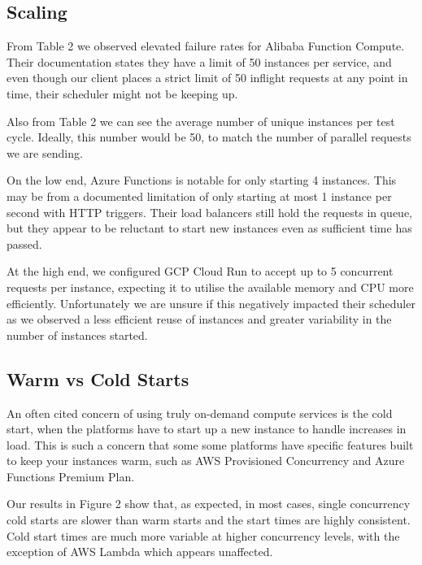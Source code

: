 \documentclass[11pt]{article}
\begin{document}
\subsection{Scaling}
From Table 2 %
we observed elevated failure rates for Alibaba Function Compute.
Their documentation %
states they have a limit of 50 instances per service,
and even though our client places a strict limit of 50 inflight requests at any point in time,
their scheduler might not be keeping up.

Also from Table 2 %
we can see the average number of unique instances per test cycle.
Ideally, this number would be 50,
to match the number of parallel requests we are sending.

On the low end,
Azure Functions is notable for only starting 4 instances.
This may be from a documented limitation %
of only starting at most 1 instance per second with HTTP triggers.
Their load balancers still hold the requests in queue,
but they appear to be reluctant to start new instances even as sufficient time has passed.

At the high end,
we configured GCP Cloud Run to accept up to 5 concurrent requests per instance,
expecting it to utilise the available memory and CPU more efficiently.
Unfortunately we are unsure if this negatively impacted their scheduler
as we observed a less efficient reuse of instances
and greater variability in the number of instances started.

\subsection{Warm vs Cold Starts}
An often cited concern of using truly on-demand compute services is the cold start,
when the platforms have to start up a new instance to handle increases in load.
This is such a concern that some some platforms have specific features
built to keep your instances warm, such as AWS Provisioned Concurrency %
and Azure Functions Premium Plan.

Our results in Figure 2 %
show that, as expected, in most cases,
single concurrency cold starts are slower than warm starts
and the start times are highly consistent.
Cold start times are much more variable at higher concurrency levels,
with the exception of AWS Lambda which appears unaffected.
\end{document}
